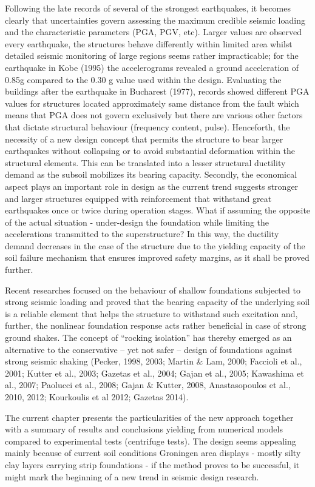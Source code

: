 \documentclass[10pt,a4paper]{report}
\begin{document}
Following the late records of several of the strongest earthquakes, it becomes clearly that uncertainties govern assessing the maximum credible seismic loading and the characteristic parameters (PGA, PGV, etc). Larger values are observed every earthquake, the structures behave differently within limited area whilst detailed seismic monitoring of large regions seems rather impracticable; for the earthquake in Kobe (1995) the accelerograms revealed a ground acceleration of 0.85g compared to the 0.30 g value used within the design. Evaluating the buildings after the earthquake in Bucharest (1977), records showed different PGA values for structures located approximately same distance from the fault which means that PGA does not govern exclusively but there are various other factors that dictate structural behaviour (frequency content, pulse). Henceforth, the necessity of a new design concept that permits the structure to bear larger earthquakes without collapsing or to avoid substantial deformation within the structural elements. This can be translated into a lesser structural ductility demand as the subsoil mobilizes its bearing capacity.
Secondly, the economical aspect plays an important role in design as the current trend suggests stronger and larger structures equipped with reinforcement that withstand great earthquakes once or twice during operation stages. What if assuming the opposite of the actual situation - under-design the foundation while limiting the accelerations transmitted to the superstructure? In this way, the ductility demand decreases in the case of the structure due to the yielding capacity of the soil failure mechanism that ensures improved safety margins, as it shall be proved further.

Recent researches focused on the behaviour of shallow foundations subjected to strong seismic loading and proved that the bearing capacity of the underlying soil is a reliable element that helps the structure to withstand such excitation and, further, the nonlinear foundation response acts rather beneficial in case of strong ground shakes.  The concept of “rocking isolation” has thereby emerged as an alternative to the conservative – yet not safer – design of foundations against strong seismic shaking (Pecker, 1998, 2003; Martin \& Lam, 2000; Faccioli et al., 2001; Kutter et al., 2003; Gazetas et al., 2004; Gajan et al., 2005; Kawashima et al., 2007; Paolucci et al., 2008; Gajan \& Kutter, 2008, Anastasopoulos et al., 2010, 2012; Kourkoulis et al 2012; Gazetas 2014). 

The current chapter presents the particularities of the new approach together with a summary of results and conclusions yielding from numerical models compared to experimental tests (centrifuge tests). The design seems appealing mainly because of current soil conditions Groningen area displays - mostly silty clay layers carrying strip foundations - if the method proves to be successful, it might mark the beginning of a new trend in seismic design research.
\end{document}
